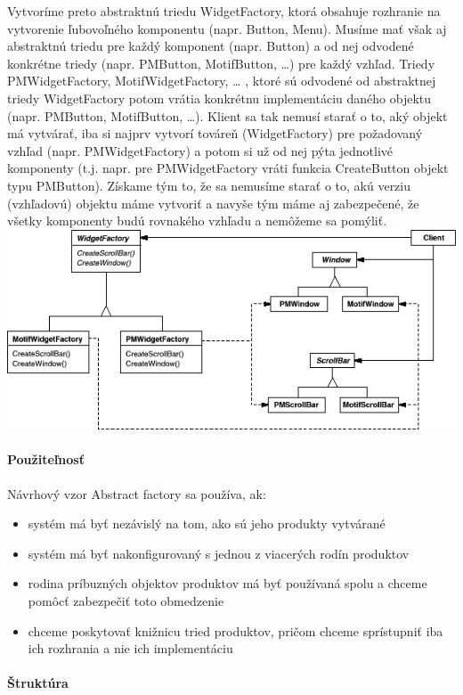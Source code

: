 		Vytvoríme preto abstraktnú triedu WidgetFactory, ktorá obsahuje rozhranie na vytvorenie ľubovoľného komponentu (napr. Button, Menu). Musíme mať však aj abstraktnú triedu pre každý komponent (napr. Button) a od nej odvodené konkrétne triedy (napr. PMButton, MotifButton, …) pre každý vzhľad. Triedy PMWidgetFactory, MotifWidgetFactory, … , ktoré sú odvodené od abstraktnej triedy WidgetFactory potom vrátia konkrétnu implementáciu daného objektu (napr. PMButton, MotifButton, …). Klient sa tak nemusí starať o to, aký objekt má vytvárať, iba si najprv vytvorí továreň (WidgetFactory) pre požadovaný vzhľad (napr. PMWidgetFactory) a potom si už od nej pýta jednotlivé komponenty (t.j. napr. pre PMWidgetFactory vráti funkcia CreateButton objekt typu PMButton). Získame tým to, že sa nemusíme starať o to, akú verziu (vzhľadovú) objektu máme vytvoriť a navyše tým máme aj zabezpečené, že všetky komponenty budú rovnakého vzhľadu a nemôžeme sa pomýliť.\\

		\includegraphics[width=.9\textwidth]{images/programovanie/abstractfactory1}

		\paragraph{Použiteľnosť}
		Návrhový vzor Abstract factory sa používa, ak:
			\begin{itemize}
				\item systém má byť nezávislý na tom, ako sú jeho produkty vytvárané
				\item systém má byť nakonfigurovaný s jednou z viacerých rodín produktov
				\item rodina príbuzných objektov produktov má byť používaná spolu a chceme pomôcť zabezpečiť toto obmedzenie
				\item chceme poskytovať knižnicu tried produktov, pričom chceme sprístupniť iba ich rozhrania a nie ich implementáciu
			\end{itemize}
		\paragraph{Štruktúra}

